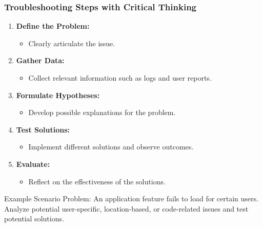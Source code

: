 \documentclass[aspectratio=169]{beamer}
\begin{document}
\begin{frame}[fragile]
    \frametitle{Troubleshooting Steps with Critical Thinking}
    \begin{enumerate}
        \item \textbf{Define the Problem:}
            \begin{itemize}
                \item Clearly articulate the issue.
            \end{itemize}
        \item \textbf{Gather Data:}
            \begin{itemize}
                \item Collect relevant information such as logs and user reports.
            \end{itemize}
        \item \textbf{Formulate Hypotheses:}
            \begin{itemize}
                \item Develop possible explanations for the problem.
            \end{itemize}
        \item \textbf{Test Solutions:}
            \begin{itemize}
                \item Implement different solutions and observe outcomes.
            \end{itemize}
        \item \textbf{Evaluate:}
            \begin{itemize}
                \item Reflect on the effectiveness of the solutions.
            \end{itemize}
    \end{enumerate}
    
    \begin{block}{Example Scenario}
        Problem: An application feature fails to load for certain users. Analyze potential user-specific, location-based, or code-related issues and test potential solutions.
    \end{block}
\end{frame}
\end{document}
